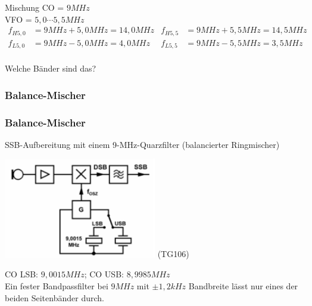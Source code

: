 \begin{frame}
  \begin{exampleblock}{Mischung}
    CO = $9 MHz$\\
    VFO = $5,0\cdots5,5MHz$
    \vspace{2em}
    \pause
    \begin{align*}
      f_{H 5,0} &= 9 MHz + 5,0 MHz = 14,0 MHz & f_{H 5,5} &= 9 MHz + 5,5 MHz = 14,5 MHz \\
      f_{L 5,0} &= 9 MHz - 5,0 MHz = 4,0 MHz  & f_{L 5,5} &= 9 MHz - 5,5 MHz = 3,5 MHz \\
    \end{align*}
  \end{exampleblock}
  \pause
  Welche Bänder sind das?
\end{frame}


\subsubsection{Balance-Mischer}

\begin{frame}
  \frametitle{Balance-Mischer}

  SSB-Aufbereitung mit einem 9-MHz-Quarzfilter (balancierter Ringmischer)

  \begin{center}
    \includegraphics[width=0.5\textwidth,height=.5\textheight,keepaspectratio]{a13/TG106.png}
    {\tiny (TG106)}
  \end{center}

  {\small CO LSB: $9,0015MHz$; CO USB: $8,9985MHz$}\\[.5em]

  Ein fester Bandpassfilter bei $9MHz$ mit $\pm1,2kHz$ Bandbreite lässt nur eines der beiden Seitenbänder durch.

\end{frame}

